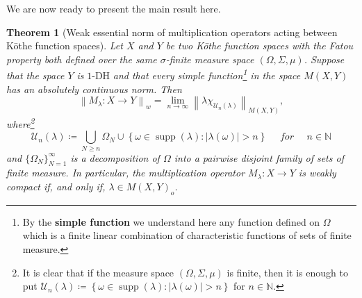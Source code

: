 \documentclass[11pt]{amsart}
\theoremstyle{definition}
\newtheorem{theorem}{Theorem}[section]
\theoremstyle{definition}
\theoremstyle{definition}
\theoremstyle{definition}
\theoremstyle{definition}
\theoremstyle{definition}
\theoremstyle{definition}
\theoremstyle{definition}
\numberwithin{equation}{section}
\numberwithin{equation}{section}
\numberwithin{equation}{section}
\theoremstyle{definition}
\theoremstyle{definition}
\theoremstyle{definition}
\theoremstyle{definition}
\theoremstyle{definition}
\theoremstyle{definition}
\DeclareMathOperator{\supp}{supp}
\newcommand{\norm}[1]{\left\lVert#1\right\rVert}
\newcommand{\abs}[1]{\left\lvert#1\right\rvert}
\begin{document}
We are now ready to present the main result here.

\begin{theorem}[Weak essential norm of multiplication operators acting between K{\" o}the function spaces] \label{THM: weak ess norm}
	{\it Let $X$ and $Y$ be two K{\" o}the function spaces with the Fatou property both defined over the same $\sigma$-finite measure space
		$(\Omega,\Sigma,\mu)$. Suppose that the space $Y$ is} $1$-DH {\it and that every simple function\footnote{By the {\bf simple function}
		we understand here any function defined on $\Omega$ which is a finite linear combination of characteristic functions of sets of
		finite measure.} in the space $M(X,Y)$ has an absolutely continuous norm. Then}
		\begin{equation*}
			\norm{M_{\lambda} \colon X \rightarrow Y}_{w} = \lim_{n \rightarrow \infty} \norm{\lambda\chi_{\mathcal{U}_n(\lambda)}}_{M(X,Y)},
		\end{equation*}
		{\it where\footnote{It is clear that if the measure space $(\Omega,\Sigma,\mu)$ is finite, then it is enough to put
			$\mathcal{U}_n(\lambda) \coloneqq \left\{ \omega \in \supp(\lambda) \colon \abs{\lambda(\omega)} > n \right\}$ for $n \in \mathbb{N}$.}}
		\begin{equation*}
			\mathcal{U}_n(\lambda) \coloneqq \bigcup\limits_{N\geqslant n}\Omega_N
				\cup \left\{ \omega \in \supp(\lambda) \colon \abs{\lambda(\omega)} > n \right\} \quad \textit{ for } \quad n \in \mathbb{N}
		\end{equation*}
		{\it and $\{\Omega_N\}_{N=1}^{\infty}$ is a decomposition of $\Omega$ into a pairwise disjoint family of sets of finite measure.
		In particular, the multiplication operator $M_{\lambda} \colon X \rightarrow Y$ is weakly compact if, and only if, $\lambda \in M(X,Y)_o$.}
\end{theorem}
\end{document}
